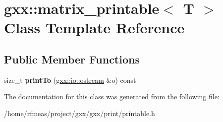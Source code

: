 \hypertarget{classgxx_1_1matrix__printable}{}\section{gxx\+:\+:matrix\+\_\+printable$<$ T $>$ Class Template Reference}
\label{classgxx_1_1matrix__printable}
\subsection*{Public Member Functions}
\begin{DoxyCompactItemize}
\item 
size\+\_\+t {\bfseries print\+To} (\hyperlink{classgxx_1_1io_1_1ostream}{gxx\+::io\+::ostream} \&o) const \hypertarget{classgxx_1_1matrix__printable_a947e58e0ff40d1455a0ec9282438af91}{}\label{classgxx_1_1matrix__printable_a947e58e0ff40d1455a0ec9282438af91}

\end{DoxyCompactItemize}


The documentation for this class was generated from the following file\+:\begin{DoxyCompactItemize}
\item 
/home/rfmeas/project/gxx/gxx/print/printable.\+h\end{DoxyCompactItemize}
